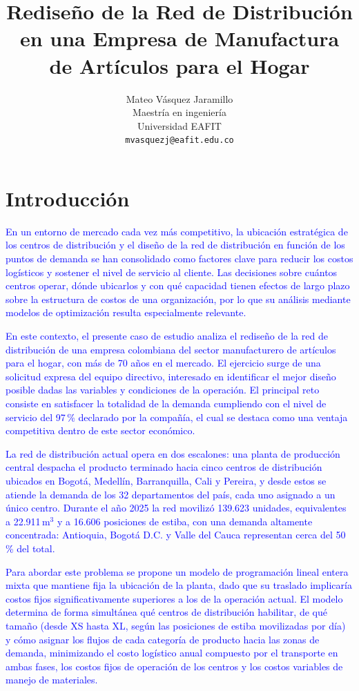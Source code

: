 \documentclass[fleqn, 11pt,letterpaper]{article}
\title{Rediseño de la Red de Distribución en una Empresa de Manufactura de Artículos para el Hogar}
\author{
    Mateo Vásquez Jaramillo\\Maestría en ingeniería\\Universidad EAFIT\\
    \texttt{mvasquezj@eafit.edu.co}
    }
\date{}
\begin{document}
\maketitle

\section{Introducción}
\textcolor{blue}{En un entorno de mercado cada vez más competitivo, la ubicación estratégica de los centros de distribución y el diseño de la red de distribución en función de los puntos de demanda se han consolidado como factores clave para reducir los costos logísticos y sostener el nivel de servicio al cliente. Las decisiones sobre cuántos centros operar, dónde ubicarlos y con qué capacidad tienen efectos de largo plazo sobre la estructura de costos de una organización, por lo que su análisis mediante modelos de optimización resulta especialmente relevante.}

\vspace{1mm}

\textcolor{blue}{En este contexto, el presente caso de estudio analiza el rediseño de la red de distribución de una empresa colombiana del sector manufacturero de artículos para el hogar, con más de 70 años en el mercado. El ejercicio surge de una solicitud expresa del equipo directivo, interesado en identificar el mejor diseño posible dadas las variables y condiciones de la operación. El principal reto consiste en satisfacer la totalidad de la demanda cumpliendo con el nivel de servicio del 97\,\% declarado por la compañía, el cual se destaca como una ventaja competitiva dentro de este sector económico.}

\vspace{1mm}

\textcolor{blue}{La red de distribución actual opera en dos escalones: una planta de producción central despacha el producto terminado hacia cinco centros de distribución ubicados en Bogotá, Medellín, Barranquilla, Cali y Pereira, y desde estos se atiende la demanda de los 32 departamentos del país, cada uno asignado a un único centro. Durante el año 2025 la red movilizó 139.623 unidades, equivalentes a 22.911\,m$^3$ y a 16.606 posiciones de estiba, con una demanda altamente concentrada: Antioquia, Bogotá D.C. y Valle del Cauca representan cerca del 50\,\% del total.}

\vspace{1mm}

\textcolor{blue}{Para abordar este problema se propone un modelo de programación lineal entera mixta que mantiene fija la ubicación de la planta, dado que su traslado implicaría costos fijos significativamente superiores a los de la operación actual. El modelo determina de forma simultánea qué centros de distribución habilitar, de qué tamaño (desde XS hasta XL, según las posiciones de estiba movilizadas por día) y cómo asignar los flujos de cada categoría de producto hacia las zonas de demanda, minimizando el costo logístico anual compuesto por el transporte en ambas fases, los costos fijos de operación de los centros y los costos variables de manejo de materiales.}
\end{document}
